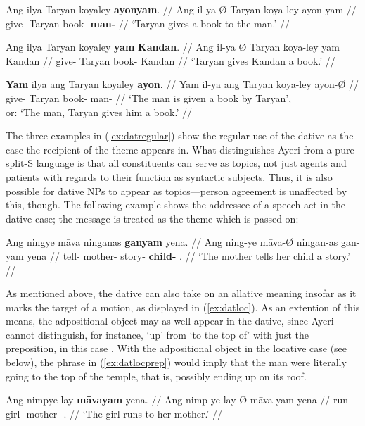 \pex\label{ex:datregular}
\a\begingl
	\gla Ang ilya {} Taryan koyaley \textbf{ayonyam}. //
	\glb Ang il-ya Ø Taryan koya-ley ayon-yam //
	\glc \AgtT{} give-\TsgM{} \Top{} Taryan book-\PargI{} 
		\textbf{man-\Dat{}} //
	\glft `Taryan gives a book to the man.' //
\endgl

\a\begingl
	\gla Ang ilya {} Taryan koyaley \textbf{yam} \textbf{Kandan}. //
	\glb Ang il-ya Ø Taryan koya-ley yam Kandan //
	\glc \AgtT{} give-\TsgM{} \Top{} Taryan book-\PargI{} \Dat{} Kandan //
	\glft `Taryan gives Kandan a book.' //
\endgl

\a\begingl
	\gla \textbf{Yam} ilya ang Taryan koyaley \textbf{ayon}. //
	\glb Yam il-ya ang Taryan koya-ley ayon-Ø //
	\glc \DatT{} give-\TsgM{} \Aarg{} Taryan book-\PargI{} man-\Top{} //
	\glft `The man is given a book by Taryan',\\
		or: `The man, Taryan gives him a book.' //
\endgl

\xe

The three examples in (\ref{ex:datregular}) show the regular use of the dative 
as the case the recipient of the theme appears in. What distinguishes Ayeri 
from a pure split-S language is that all constituents can serve as topics, not 
just agents and patients with regards to their function as syntactic subjects. 
Thus, it is also possible for dative NPs to appear as topics---person 
agreement is unaffected by this, though. The following example shows the 
addressee of a speech act in the dative case; the message is treated as the 
theme which is passed on:

\ex
\begingl
	\gla Ang ningye māva ninganas \textbf{ganyam} yena. //
	\glb Ang ning-ye māva-Ø ningan-as gan-yam yena //
	\glc \AgtT{} tell-\TsgF{} mother-\Top{} story-\Parg{} 
		\textbf{child-\Dat{}} \TsgF{}.\Gen{} //
	\glft `The mother tells her child a story.' //
\endgl
\xe

As mentioned above, the dative can also take on an allative meaning insofar as 
it marks the target of a motion, as displayed in (\ref{ex:datloc}). As an 
extention of this means, the adpositional object may as well appear in the 
dative, since Ayeri cannot distinguish, for instance, `up' from `to the top of' 
with just the preposition, in this case . With the 
adpositional object in the locative case (see below), the phrase in 
(\ref{ex:datlocprep}) would imply that the man were literally going to the top 
of the temple, that is, possibly ending up on its roof.

\pex
\a\label{ex:datloc}\begingl
	\gla Ang nimpye lay \textbf{māvayam} yena. //
	\glb Ang nimp-ye lay-Ø māva-yam yena //
	\glc \AgtT{} run-\TsgF{} girl-\Top{} mother-\Dat{} \TsgF{}.\Gen{} //
	\glft `The girl runs to her mother.' //
\endgl

